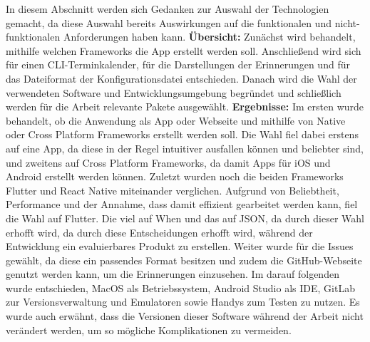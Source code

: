 In diesem Abschnitt werden sich Gedanken zur Auswahl der Technologien gemacht, da diese Auswahl bereits Auswirkungen auf die funktionalen und nicht-funktionalen Anforderungen haben kann.\newline%
\textbf{Übersicht:} %
Zunächst wird behandelt, mithilfe welchen Frameworks die App erstellt werden soll. Anschließend wird sich für einen CLI-Terminkalender, für die Darstellungen der Erinnerungen und für das Dateiformat der Konfigurationsdatei entschieden. Danach wird die Wahl der verwendeten Software und Entwicklungsumgebung begründet und schließlich werden für die Arbeit relevante Pakete ausgewählt.\newline%
\textbf{Ergebnisse:} %
	Im ersten  wurde behandelt, ob die Anwendung als App oder Webseite und mithilfe von Native oder Cross Platform Frameworks erstellt werden soll. Die Wahl fiel dabei erstens auf eine App, da diese in der Regel intuitiver ausfallen können und beliebter sind, und zweitens auf Cross Platform Frameworks, da damit Apps für iOS und Android erstellt werden können. Zuletzt wurden noch die beiden Frameworks Flutter und React Native miteinander verglichen. Aufgrund von Beliebtheit, Performance und der Annahme, dass damit effizient gearbeitet werden kann, fiel die Wahl auf Flutter.\newline%
	Die  viel auf When und das  auf JSON, da durch dieser Wahl erhofft wird, da durch diese Entscheidungen erhofft wird, während der Entwicklung ein evaluierbares Produkt zu erstellen.%
	Weiter wurde für die  Issues gewählt, da diese ein passendes Format besitzen und zudem die GitHub-Webseite genutzt werden kann, um die Erinnerungen einzusehen.\newline%
	Im darauf folgenden  wurde entschieden, MacOS als Betriebssystem, Android Studio als IDE, GitLab zur Versionsverwaltung und Emulatoren sowie Handys zum Testen zu nutzen. Es wurde auch erwähnt, dass die Versionen dieser Software während der Arbeit nicht verändert werden, um so mögliche Komplikationen zu vermeiden.\newline%
